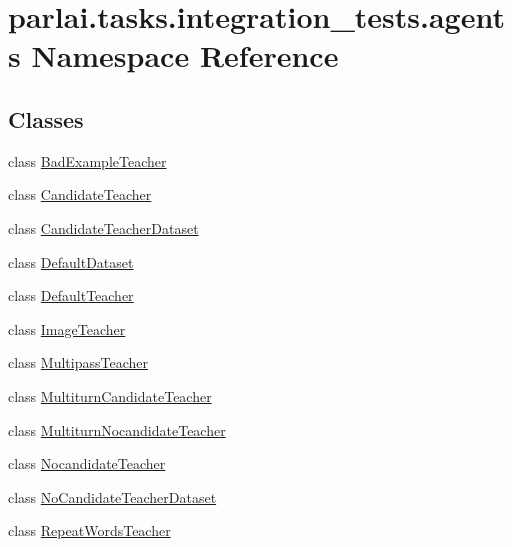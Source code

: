\hypertarget{namespaceparlai_1_1tasks_1_1integration__tests_1_1agents}{}\section{parlai.\+tasks.\+integration\+\_\+tests.\+agents Namespace Reference}
\label{namespaceparlai_1_1tasks_1_1integration__tests_1_1agents}
\subsection*{Classes}
\begin{DoxyCompactItemize}
\item 
class \hyperlink{classparlai_1_1tasks_1_1integration__tests_1_1agents_1_1BadExampleTeacher}{Bad\+Example\+Teacher}
\item 
class \hyperlink{classparlai_1_1tasks_1_1integration__tests_1_1agents_1_1CandidateTeacher}{Candidate\+Teacher}
\item 
class \hyperlink{classparlai_1_1tasks_1_1integration__tests_1_1agents_1_1CandidateTeacherDataset}{Candidate\+Teacher\+Dataset}
\item 
class \hyperlink{classparlai_1_1tasks_1_1integration__tests_1_1agents_1_1DefaultDataset}{Default\+Dataset}
\item 
class \hyperlink{classparlai_1_1tasks_1_1integration__tests_1_1agents_1_1DefaultTeacher}{Default\+Teacher}
\item 
class \hyperlink{classparlai_1_1tasks_1_1integration__tests_1_1agents_1_1ImageTeacher}{Image\+Teacher}
\item 
class \hyperlink{classparlai_1_1tasks_1_1integration__tests_1_1agents_1_1MultipassTeacher}{Multipass\+Teacher}
\item 
class \hyperlink{classparlai_1_1tasks_1_1integration__tests_1_1agents_1_1MultiturnCandidateTeacher}{Multiturn\+Candidate\+Teacher}
\item 
class \hyperlink{classparlai_1_1tasks_1_1integration__tests_1_1agents_1_1MultiturnNocandidateTeacher}{Multiturn\+Nocandidate\+Teacher}
\item 
class \hyperlink{classparlai_1_1tasks_1_1integration__tests_1_1agents_1_1NocandidateTeacher}{Nocandidate\+Teacher}
\item 
class \hyperlink{classparlai_1_1tasks_1_1integration__tests_1_1agents_1_1NoCandidateTeacherDataset}{No\+Candidate\+Teacher\+Dataset}
\item 
class \hyperlink{classparlai_1_1tasks_1_1integration__tests_1_1agents_1_1RepeatWordsTeacher}{Repeat\+Words\+Teacher}
\end{DoxyCompactItemize}
